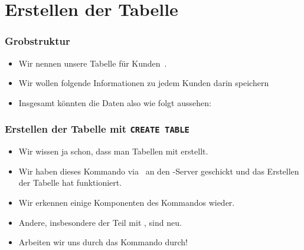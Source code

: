 \documentclass[aspectratio=169,mathserif,notheorems]{beamer}%
\begin{document}
\section{Erstellen der Tabelle}%
%
\begin{frame}[t]%
\frametitle{Grobstruktur}%
\begin{itemize}%
\item Wir nennen unsere Tabelle für Kunden~.%
\item<2-> Wir wollen folgende Informationen zu jedem Kunden darin speichern%
\item<6-> Insgesamt könnten die Daten also wie folgt aussehen:%
\end{itemize}%
%
\end{frame}%
%
\begin{frame}[t]
\frametitle{Erstellen der Tabelle mit \texttt{CREATE TABLE}}%
\begin{itemize}%
\item Wir wissen ja schon, dass man Tabellen mit  erstellt.%
\item<4-> Wir haben dieses Kommando via \psql\ an den \postgresql-Server geschickt und das Erstellen der Tabelle hat funktioniert.%
\item<5-> Wir erkennen einige Komponenten des Kommandos wieder.%
\item<6-> Andere, insbesondere der Teil mit , sind neu.%
\item<7-> Arbeiten wir uns durch das Kommando durch!%
\end{itemize}%
%
%
\end{frame}
%
\end{document}
